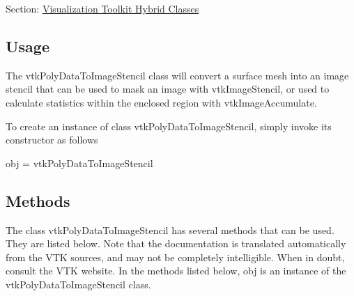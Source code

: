 Section\-: \hyperlink{sec_vtkhybrid}{Visualization Toolkit Hybrid Classes} \hypertarget{vtkwidgets_vtkxyplotwidget_Usage}{}\subsection{Usage}\label{vtkwidgets_vtkxyplotwidget_Usage}
The vtk\-Poly\-Data\-To\-Image\-Stencil class will convert a surface mesh into an image stencil that can be used to mask an image with vtk\-Image\-Stencil, or used to calculate statistics within the enclosed region with vtk\-Image\-Accumulate.

To create an instance of class vtk\-Poly\-Data\-To\-Image\-Stencil, simply invoke its constructor as follows \begin{DoxyVerb}  obj = vtkPolyDataToImageStencil
\end{DoxyVerb}
 \hypertarget{vtkwidgets_vtkxyplotwidget_Methods}{}\subsection{Methods}\label{vtkwidgets_vtkxyplotwidget_Methods}
The class vtk\-Poly\-Data\-To\-Image\-Stencil has several methods that can be used. They are listed below. Note that the documentation is translated automatically from the V\-T\-K sources, and may not be completely intelligible. When in doubt, consult the V\-T\-K website. In the methods listed below, {\ttfamily obj} is an instance of the vtk\-Poly\-Data\-To\-Image\-Stencil class. 
